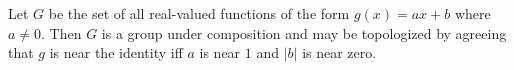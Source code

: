 Let $G$ be the set of all real-valued functions of the form $g(x) = ax + b$ where $a \neq 0$. Then $G$ is a group under composition and may be topologized by agreeing that $g$ is near the identity iff $a$ is near $1$ and $|b|$ is near zero.
